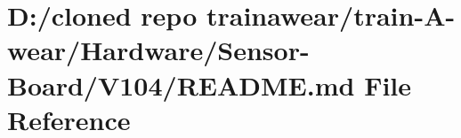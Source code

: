 \hypertarget{_hardware_2_sensor-_board_2_v104_2_r_e_a_d_m_e_8md}{}\section{D\+:/cloned repo trainawear/train-\/\+A-\/wear/\+Hardware/\+Sensor-\/\+Board/\+V104/\+R\+E\+A\+D\+ME.md File Reference}
\label{_hardware_2_sensor-_board_2_v104_2_r_e_a_d_m_e_8md}
